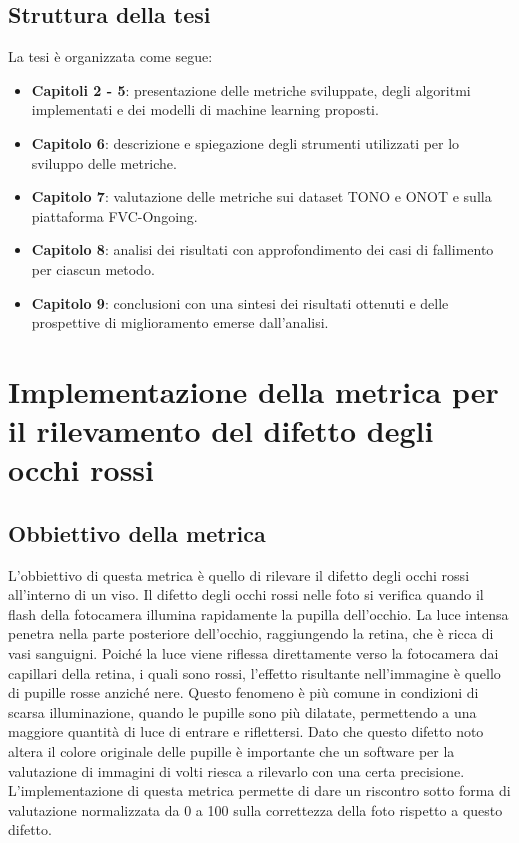 \documentclass[12pt,a4paper,openright,twoside]{book}
\begin{document}
\section{Struttura della tesi}
La tesi è organizzata come segue: 
\begin{itemize}
    \item \textbf{Capitoli 2 - 5}: presentazione delle metriche sviluppate, degli algoritmi implementati e dei modelli di machine learning proposti.
    \item \textbf{Capitolo 6}: descrizione e spiegazione degli strumenti utilizzati per lo sviluppo delle metriche.
    \item \textbf{Capitolo 7}: valutazione delle metriche sui dataset TONO e ONOT e sulla piattaforma FVC-Ongoing.
    \item \textbf{Capitolo 8}: analisi dei risultati con approfondimento dei casi di fallimento per ciascun metodo.
    \item \textbf{Capitolo 9}: conclusioni con una sintesi dei risultati ottenuti e delle prospettive di miglioramento emerse dall'analisi.
\end{itemize}


\chapter{Implementazione della metrica per il rilevamento del difetto degli occhi rossi}
\label{chap:red-eye}

\section{Obbiettivo della metrica}
L'obbiettivo di questa metrica è quello di rilevare il difetto degli occhi rossi all'interno di un viso. 
Il difetto degli occhi rossi nelle foto si verifica quando il flash della fotocamera illumina rapidamente la pupilla dell'occhio. La luce intensa penetra nella parte posteriore dell'occhio, raggiungendo la retina, che è ricca di vasi sanguigni. Poiché la luce viene riflessa direttamente verso la fotocamera dai capillari della retina, i quali sono rossi, l'effetto risultante nell'immagine è quello di pupille rosse anziché nere. Questo fenomeno è più comune in condizioni di scarsa illuminazione, quando le pupille sono più dilatate, permettendo a una maggiore quantità di luce di entrare e riflettersi.
Dato che questo difetto noto altera il colore originale delle pupille è importante che un software per la valutazione di immagini di volti riesca a rilevarlo con una certa precisione.
L'implementazione di questa metrica permette di dare un riscontro sotto forma di valutazione normalizzata da 0 a 100 sulla correttezza della foto rispetto a questo difetto.
\end{document}
